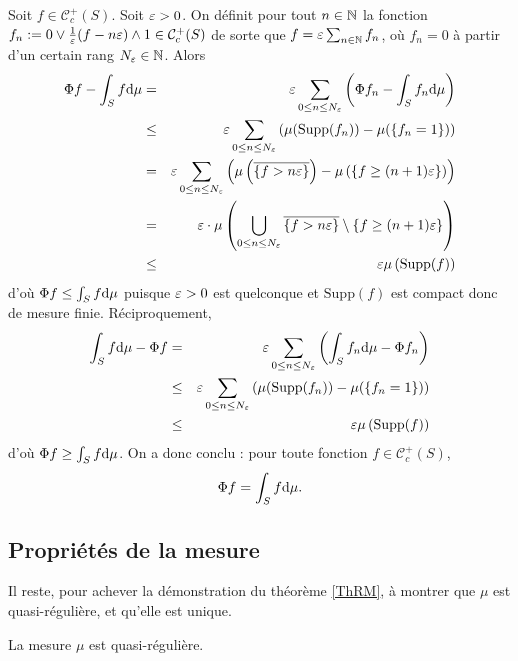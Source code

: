 \documentclass{article}
\begin{document}
Soit $f\in\mathcal C_c^+(S)$. Soit $\varepsilon>0$. On définit pour tout $n\in\mathbb{N}$ la fonction $f_n:=0\vee\frac1{\varepsilon}(f-n\varepsilon)\wedge1\in\mathcal C_c^+(S)$ de sorte que $f=\varepsilon\sum_{n\in\mathbb{N}}f_n$, où $f_n=0$ à partir d'un certain rang $N_\varepsilon\in\mathbb{N}$. Alors
\begin{eqnarray*}
\Phi f-\int_Sf\mathrm{d}\mu
  &   =& \varepsilon\sum_{0\leq n\leq N_\varepsilon}\left(\Phi f_n-\int_Sf_n\mathrm{d}\mu\right)\\
  &\leq& \varepsilon\sum_{0\leq n\leq N_\varepsilon}\left(\mu(\mathrm{Supp}(f_n))-\mu(\left\{f_n=1\right\})\right)\\
  &   =& \varepsilon\sum_{0\leq n\leq N_\varepsilon}\left( \mu\left(\overline{\left\{f>n\varepsilon\right\}}\right)
                                           - \mu\left(\left\{f\geq (n+1)\varepsilon\right\}\right)
                                      \right)\\
  &   =& \varepsilon\cdot\mu\left(\bigcup_{0\leq n\leq N_\varepsilon} \overline{\left\{f>n\varepsilon\right\}}
                                         \setminus \left\{f\geq (n+1)\varepsilon\right\}\right)\\
  &\leq& \varepsilon\mu\left(\mathrm{Supp}(f)\right)
\end{eqnarray*}
d'où $\Phi f\leq\int_Sf\mathrm{d}\mu$ puisque $\varepsilon>0$ est quelconque et $\mathrm{Supp}(f)$ est compact donc de mesure finie. Réciproquement,
\begin{eqnarray*}
\int_Sf\mathrm{d}\mu-\Phi f
  &   =& \varepsilon\sum_{0\leq n\leq N_\varepsilon}\left(\int_Sf_n\mathrm{d}\mu-\Phi f_n\right)\\
  &\leq& \varepsilon\sum_{0\leq n\leq N_\varepsilon}\left(\mu(\mathrm{Supp}(f_n))-\mu(\left\{f_n=1\right\})\right)\\
  &\leq& \varepsilon\mu\left(\mathrm{Supp}(f)\right)
\end{eqnarray*}
d'où $\Phi f\geq \int_Sf\mathrm{d}\mu$. On a donc conclu : pour toute fonction $f\in\mathcal C_c^+(S)$,
$$\Phi f=\int_Sf\mathrm{d}\mu\text.$$

\subsection{Propriétés de la mesure}

Il reste, pour achever la démonstration du théorème \ref{ThRM}, à montrer que $\mu$ est quasi-régulière, et qu'elle est unique.

\begin{Thm} La mesure $\mu$ est quasi-régulière. \end{Thm}
\end{document}
